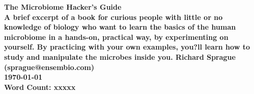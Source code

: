 \documentclass[11pt,letterpaper]{report}
\begin{document}
   \begin{titlepage}
     \centering
     \vspace*{11\baselineskip}
     \large
     \bfseries
     The Microbiome Hacker's Guide \\[5\baselineskip]
     \normalfont
     \small
     A brief excerpt of a book for curious people with little or no knowledge of biology who want to learn the basics of the human microbiome in a hands-on, practical way, by experimenting on yourself. By practicing with your own examples, you?ll learn how to study and manipulate the microbes inside you.     \vfill
     Richard Sprague \\
     (sprague@ensembio.com) \\[2\baselineskip]
     \textbf{\today} \\[2\baselineskip]
     Word Count: {\color{red}xxxxx}
   \end{titlepage}
\end{document}

